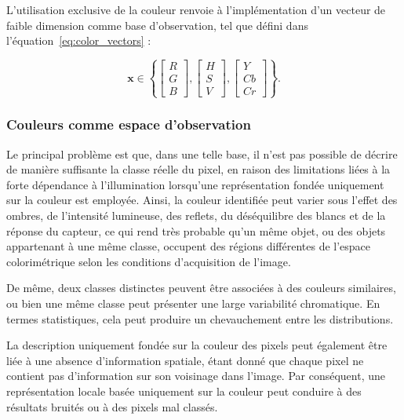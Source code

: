 L’utilisation exclusive de la couleur renvoie à l’implémentation d’un vecteur de faible dimension comme base d’observation, tel que défini dans l’équation~\eqref{eq:color_vectors} :

\begin{equation}
\mathbf{x} \in \left\{
\begin{bmatrix}
R\\
G\\
B
\end{bmatrix},
\begin{bmatrix}
H\\
S\\
V
\end{bmatrix},
\begin{bmatrix}
Y\\
Cb\\
Cr
\end{bmatrix}
\right\}.
\label{eq:color_vectors}
\end{equation}

\subsubsection{Couleurs comme espace d’observation}


Le principal problème est que, dans une telle base, il n’est pas possible de décrire de manière suffisante la classe réelle du pixel, en raison des limitations liées à la forte dépendance à l’illumination lorsqu’une représentation fondée uniquement sur la couleur est employée. Ainsi, la couleur identifiée peut varier sous l’effet des ombres, de l’intensité lumineuse, des reflets, du déséquilibre des blancs et de la réponse du capteur, ce qui rend très probable qu’un même objet, ou des objets appartenant à une même classe, occupent des régions différentes de l’espace colorimétrique selon les conditions d’acquisition de l’image.

De même, deux classes distinctes peuvent être associées à des couleurs similaires, ou bien une même classe peut présenter une large variabilité chromatique. En termes statistiques, cela peut produire un chevauchement entre les distributions.

La description uniquement fondée sur la couleur des pixels peut également être liée à une absence d’information spatiale, étant donné que chaque pixel ne contient pas d’information sur son voisinage dans l’image. Par conséquent, une représentation locale basée uniquement sur la couleur peut conduire à des résultats bruités ou à des pixels mal classés.

